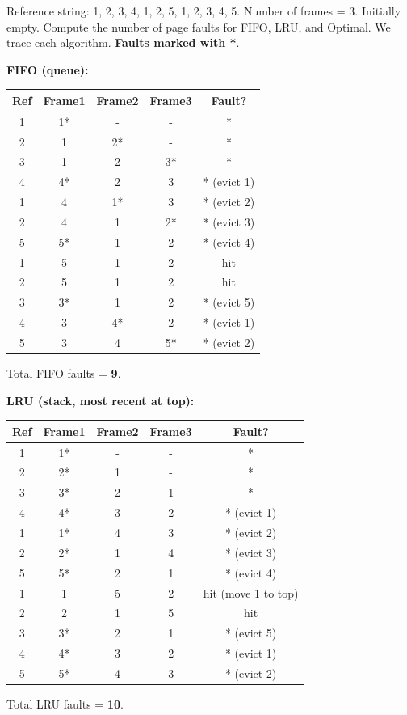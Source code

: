 \documentclass[11pt]{article}
\begin{document}
\begin{exoresolu}
Reference string: 1, 2, 3, 4, 1, 2, 5, 1, 2, 3, 4, 5.
Number of frames = 3. Initially empty.
Compute the number of page faults for FIFO, LRU, and Optimal.
\tcblower
We trace each algorithm. \textbf{Faults marked with *}.

\textbf{FIFO (queue):}
\begin{center}
\begin{tabular}{|c|c|c|c|c|}\hline
Ref & Frame1 & Frame2 & Frame3 & Fault? \\ \hline
1 & 1* & - & - & * \\
2 & 1 & 2* & - & * \\
3 & 1 & 2 & 3* & * \\
4 & 4* & 2 & 3 & * (evict 1) \\
1 & 4 & 1* & 3 & * (evict 2) \\
2 & 4 & 1 & 2* & * (evict 3) \\
5 & 5* & 1 & 2 & * (evict 4) \\
1 & 5 & 1 & 2 & hit \\
2 & 5 & 1 & 2 & hit \\
3 & 3* & 1 & 2 & * (evict 5) \\
4 & 3 & 4* & 2 & * (evict 1) \\
5 & 3 & 4 & 5* & * (evict 2) \\ \hline
\end{tabular}
\end{center}
Total FIFO faults = \textbf{9}.

\textbf{LRU (stack, most recent at top):}
\begin{center}
\begin{tabular}{|c|c|c|c|c|}\hline
Ref & Frame1 & Frame2 & Frame3 & Fault? \\ \hline
1 & 1* & - & - & * \\
2 & 2* & 1 & - & * \\
3 & 3* & 2 & 1 & * \\
4 & 4* & 3 & 2 & * (evict 1) \\
1 & 1* & 4 & 3 & * (evict 2) \\
2 & 2* & 1 & 4 & * (evict 3) \\
5 & 5* & 2 & 1 & * (evict 4) \\
1 & 1 & 5 & 2 & hit (move 1 to top) \\
2 & 2 & 1 & 5 & hit \\
3 & 3* & 2 & 1 & * (evict 5) \\
4 & 4* & 3 & 2 & * (evict 1) \\
5 & 5* & 4 & 3 & * (evict 2) \\ \hline
\end{tabular}
\end{center}
Total LRU faults = \textbf{10}.


\end{exoresolu}
\end{document}
